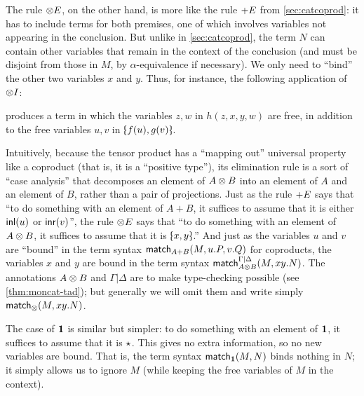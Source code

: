 The rule $\tensorE$, on the other hand, is more like the rule $\plusE$ from \cref{sec:catcoprod}: it has to include terms for both premises, one of which involves variables not appearing in the conclusion.
But unlike in \cref{sec:catcoprod}, the term $N$ can contain other variables that remain in the context of the conclusion (and must be disjoint from those in $M$, by $\alpha$-equivalence if necessary).
We only need to ``bind'' the other two variables $x$ and $y$.
Thus, for instance, the following application of $\tensorI$:
\begin{mathpar}
\end{mathpar}
produces a term %
in which the variables $z,w$ in $h(z,x,y,w)$ are free, in addition to the free variables $u,v$ in $\tpair{f(u)}{g(v)}$.

Intuitively, because the tensor product has a ``mapping out'' universal property like a coproduct (that is, it is a ``positive type''), its elimination rule is a sort of ``case analysis'' that decomposes an element of $A\tensor B$ into an element of $A$ and an element of $B$, rather than a pair of projections.
Just as the rule $\plusE$ says that ``to do something with an element of $A+B$, it suffices to assume that it is either $\inl(u)$ or $\inr(v)$'', the rule $\tensorE$ says that ``to do something with an element of $A\tensor B$, it suffices to assume that it is $\tpair{x}{y}$.''
And just as the variables $u$ and $v$ are ``bound'' in the term syntax $\acase AB(M,u.P,v.Q)$ for coproducts, the variables $x$ and $y$ are bound in the term syntax $\match_{A\tensor B}^{\Gamma|\Delta}(M,xy.N)$.
The annotations $A\tensor B$ and $\Gamma|\Delta$ are to make type-checking possible (see \cref{thm:moncat-tad}); but generally we will omit them and write simply $\match_\tensor(M,xy.N)$.

The case of $\one$ is similar but simpler: to do something with an element of $\one$, it suffices to assume that it is $\ott$.
This gives no extra information, so no new variables are bound.
That is, the term syntax $\match_\one(M,N)$ binds nothing in $N$; it simply allows us to ignore $M$ (while keeping the free variables of $M$ in the context).

